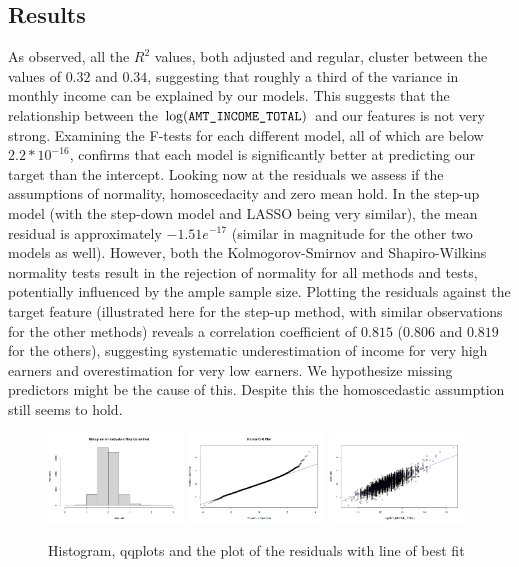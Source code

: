 \documentclass[hidelinks,12pt]{article}
\begin{document}
\subsection{Results}
As observed, all the $R^2$ values, both adjusted and regular, cluster between the values of $0.32$ and $0.34$, suggesting that roughly a third of the variance in monthly income can be explained by our models. This suggests that the relationship between the $\log(\verb|AMT_INCOME_TOTAL|)$ and our features is not very strong. Examining the F-tests for each different model, all of which are below $2.2*10^{-16}$, confirms that each model is significantly better at predicting our target than the intercept. Looking now at the residuals we assess if the assumptions of normality, homoscedacity and zero mean hold. In the step-up model (with the step-down model and LASSO being very similar), the mean residual is approximately $-1.51e^{-17}$ (similar in magnitude for the other two models as well). However, both the Kolmogorov-Smirnov and Shapiro-Wilkins normality tests result in the rejection of normality for all methods and tests, potentially influenced by the ample sample size. Plotting the residuals against the target feature (illustrated here for the step-up method, with similar observations for the other methods) reveals a correlation coefficient of $0.815$ ($0.806$ and $0.819$ for the others), suggesting systematic underestimation of income for very high earners and overestimation for very low earners. We hypothesize missing predictors might be the cause of this. Despite this the homoscedastic assumption still seems to hold. 
\begin{figure}[h]
  \begin{center}
  \includegraphics[width=0.32\textwidth]{img/20da428d-0af1-4f49-a7aa-66b7a1fe13bc.png}
  \includegraphics[width=0.32\textwidth]{img/6f01eecb-4039-4daa-ba0c-af7263bd658c.png}
  \includegraphics[width=0.32\textwidth]{img/b94b8a81-3824-47f5-a158-d8e9560e6ce2.png}
\end{center}
\caption{Histogram, qqplots and the plot of the residuals with line of best fit}
\end{figure}
\end{document}
